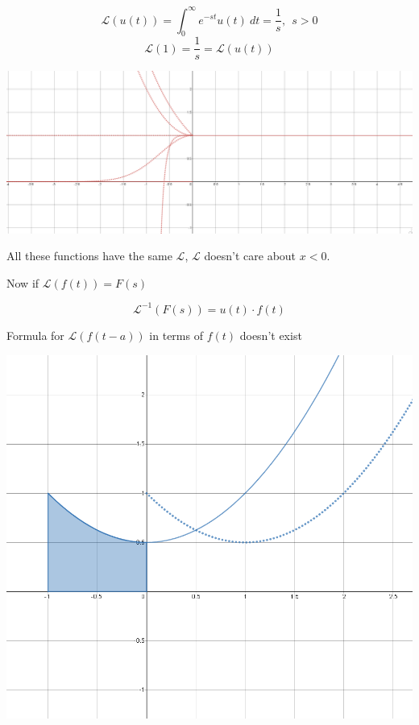 \documentclass[12pt]{article}
\numberwithin{equation}{subsection}
\newcommand{\lap}{\mathscr{L}}
\newcommand{\indd}{\hspace{2cm}}
\begin{document}
\begin{equation}
\lap (u(t)) = \int_0^\infty e^{-st} u(t) \ dt = \frac{1}{s},\ \ s>0
\end{equation}
\begin{equation}
\lap(1) = \frac{1}{s} = \lap (u(t))
\end{equation}

\includegraphics[scale=.25]{tails}

All these functions have the same $\lap$,  $\lap$ doesn't care about $x<0$.

\newpage

Now if $\lap(f(t))=F(s)$

\begin{equation}
\lap^{-1}(F(s))= u(t)\cdot f(t)
\end{equation}

Formula for $\lap (f(t-a))$ in terms of $f(t)$ doesn't exist

\indd \includegraphics[scale=.25]{tran}
\end{document}
